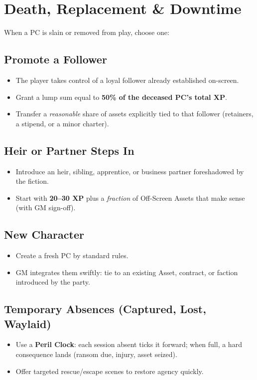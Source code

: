 \documentclass[12pt]{article}
\begin{document}
\section{Death, Replacement \& Downtime}
When a PC is slain or removed from play, choose one:

\subsection{Promote a Follower}
\begin{itemize}
  \item The player takes control of a loyal follower already established on-screen.
  \item Grant a lump sum equal to \textbf{50\% of the deceased PC's total XP}.
  \item Transfer a \textit{reasonable} share of assets explicitly tied to that follower (retainers, a stipend, or a minor charter).
\end{itemize}

\subsection{Heir or Partner Steps In}
\begin{itemize}
  \item Introduce an heir, sibling, apprentice, or business partner foreshadowed by the fiction.
  \item Start with \textbf{20–30 XP} plus a \textit{fraction} of Off-Screen Assets that make sense (with GM sign-off).
\end{itemize}

\subsection{New Character}
\begin{itemize}
  \item Create a fresh PC by standard rules.
  \item GM integrates them swiftly: tie to an existing Asset, contract, or faction introduced by the party.
\end{itemize}

\subsection{Temporary Absences (Captured, Lost, Waylaid)}
\begin{itemize}
  \item Use a \textbf{Peril Clock}: each session absent ticks it forward; when full, a hard consequence lands (ransom due, injury, asset seized).
  \item Offer targeted rescue/escape scenes to restore agency quickly.
\end{itemize}
\end{document}
